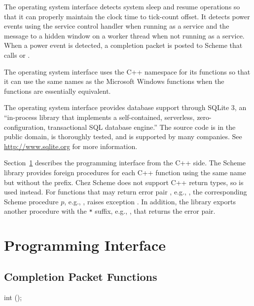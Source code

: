 The operating system interface detects system sleep and resume
operations so that it can properly maintain the clock time to
tick-count offset. It detects power events using the service control
handler when running as a service and the 
message to a hidden window on a worker thread when not running as a
service.  When a power event is detected, a completion packet is
posted to Scheme that calls  or
.

The operating system interface uses the C++ namespace  for
its functions so that it can use the same names as the Microsoft
Windows functions when the functions are essentially equivalent.

The operating system interface provides database support through
SQLite 3, an ``in-process library that implements a self-contained,
serverless, zero-configuration, transactional SQL database engine.''
The source code is in the public domain, is thoroughly tested, and is
supported by many companies. See \url{http://www.sqlite.org} for more
information.

Section~\ref{sec:osi-api} describes the programming interface from the
C++ side. The Scheme library  provides foreign
procedures for each C++ function using the same name but without the
 prefix. Chez Scheme does not support C++ 
return types, so  is used instead. For functions that may
return error pair , e.g.,
, the corresponding Scheme procedure $p$, e.g.,
, raises exception . In addition, the  library exports
another procedure with the \verb|*| suffix, e.g., ,
that returns the error pair.

\section {Programming Interface}\label{sec:osi-api}

\subsection {Completion Packet Functions}

\begin{function}
  int ();
\end{function}\antipar

